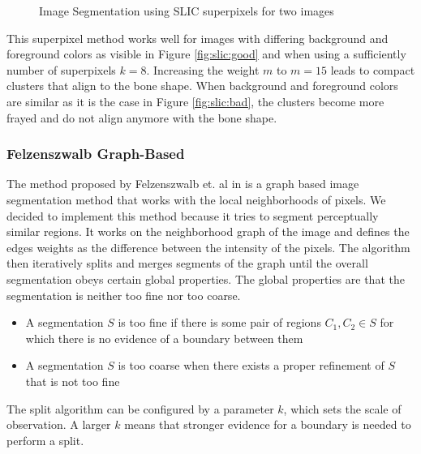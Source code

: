\documentclass[pdftex,12pt,a4paper]{report}
\begin{document}
\begin{figure}[h]
\begin{subfigure}[b]{0.24\textwidth}
		\subcaption*{}
		\label{}
	\end{subfigure}
	\caption{Image Segmentation using SLIC superpixels for two images}
	\label{fig:slic}
\end{figure}

This superpixel method works well for images with differing background and foreground colors as visible in Figure \ref{fig:slic:good} and when using a sufficiently number of superpixels $k=8$. Increasing the weight $m$ to $m=15$ leads to compact clusters that align to the bone shape. When background and foreground colors are similar as it is the case in Figure \ref{fig:slic:bad}, the clusters become more frayed and do not align anymore with the bone shape.

\subsubsection{Felzenszwalb Graph-Based}

The method proposed by Felzenszwalb et. al in \cite{felzenszwalb2004efficient} is a graph based image segmentation method that works with the local neighborhoods of pixels. We decided to implement this method because it tries to segment perceptually similar regions. It works on the neighborhood graph of the image and defines the edges weights as the difference between the intensity of the pixels. The algorithm then iteratively splits and merges segments of the graph until the overall segmentation obeys certain global properties. The global properties are that the segmentation is neither too fine nor too coarse.

\begin{itemize}
	\item A segmentation $S$ is too fine if there is some pair of regions $C_1, C_2 \in S$ for which there is no evidence of a boundary between them
	\item A segmentation $S$ is too coarse when there exists a proper refinement of $S$ that is not too fine
\end{itemize}

The split algorithm can be configured by a parameter $k$, which sets the scale of observation. A larger $k$ means that stronger evidence for a boundary is needed to perform a split.
\end{document}
